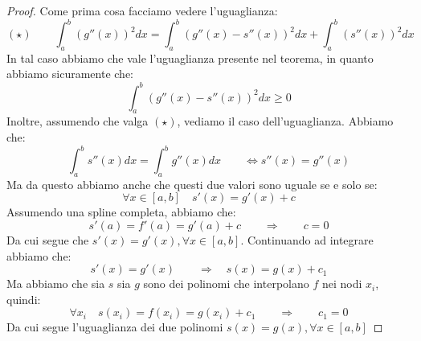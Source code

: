 \documentclass[11pt,a4paper,twoside]{article}
\theoremstyle{definition}
\begin{document}
\begin{proof}
	Come prima cosa facciamo vedere l'uguaglianza:
	\[ (\star)\qquad \int_a^b (g''(x))^2 dx = \int_a^b (g''(x)-s''(x))^2dx + \int_a^b(s''(x))^2dx \]
	In tal caso abbiamo che vale l'uguaglianza presente nel teorema, in quanto abbiamo sicuramente che:
	\[ \int_a^b(g''(x) - s''(x))^2dx \geq 0 \]
	Inoltre, assumendo che valga $(\star)$, vediamo il caso dell'uguaglianza. Abbiamo che:
	\[ \int_a^b s''(x)dx = \int_a^b g''(x)dx \qquad \Leftrightarrow s''(x) = g''(x) \]
	Ma da questo abbiamo anche che questi due valori sono uguale se e solo se:
	\[ \forall x \in [a,b] \quad s'(x) = g'(x) + c \]
	Assumendo una spline completa, abbiamo che:
	\[ s'(a) = f'(a) = g'(a) + c \qquad \Rightarrow \qquad c = 0 \]
	Da cui segue che $s'(x) = g'(x), \forall x \in [a,b]$. Continuando ad integrare abbiamo che:
	\[ s'(x) = g'(x) \qquad \Rightarrow \quad s(x) = g(x) + c_1\]
	Ma abbiamo che sia $s$ sia $g$ sono dei polinomi che interpolano $f$ nei nodi $x_i$, quindi:
	\[ \forall x_i\quad s(x_i) = f(x_i) = g(x_i) + c_1\qquad \Rightarrow \qquad c_1 = 0 \]
	Da cui segue l'uguaglianza dei due polinomi $s(x) = g(x), \forall x \in [a,b]$


\end{proof}
\end{document}
